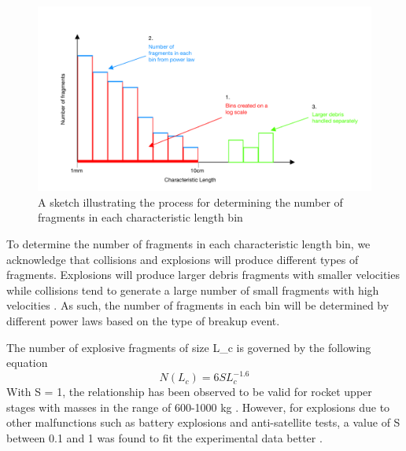 \documentclass[a4paper, 12pt]{article}
\begin{document}
\begin{figure}[H]
	\centering
	\includegraphics[scale=0.6]{char_len_diagram}
	\caption{A sketch illustrating the process for determining the number of fragments in each characteristic length bin}
	\label{bins_sketch}
\end{figure}

To determine the number of fragments in each characteristic length bin, we acknowledge that collisions and explosions will produce different types of fragments. Explosions will produce larger debris fragments with smaller velocities while collisions tend to generate a large number of small fragments with high velocities \citep{barrows_evolution_1996}.  As such, the number of fragments in each bin will be determined by different power laws based on the type of breakup event.
 
The number of explosive fragments of size \Gls{L_c} is governed by the following equation
\begin{equation}
	N(L_c) =6 S L_c^{-1.6}
\end{equation}
With S = 1, the relationship has been observed to be valid for rocket upper stages with masses in the range of 600-1000 kg \citep{johnson_nasas_2001}. However, for explosions due to other malfunctions such as battery explosions and anti-satellite tests, a value of S between 0.1 and 1 was found to fit the experimental data better \citep{krisko_proper_2011}.
\end{document}
